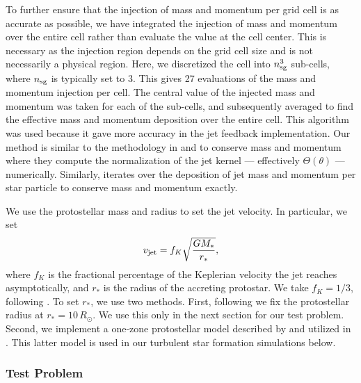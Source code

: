 \documentclass[../dissertation.tex]{subfiles}
\begin{document}
To further ensure that the injection of mass and momentum per grid cell is as accurate as possible, we have integrated the injection of mass and momentum over the entire cell rather than evaluate the value at the cell center.  This is necessary as the injection region depends on the grid cell size and is not necessarily a physical region.
Here, we discretized the cell into $n_{\rm sg}^3$ sub-cells, where $n_{\rm sg}$ is typically set to 3. This gives 27 evaluations of the mass and momentum injection per cell.
The central value of the injected mass and momentum was taken for each of the sub-cells, and subsequently averaged to find the effective mass and momentum deposition over the entire cell.
This algorithm was used because it gave more accuracy in the jet feedback implementation.
Our method is similar to the methodology in \citet{2011ApJ...740..107C} and \citet{2014MNRAS.439.3420M} to conserve mass and momentum where they compute the normalization of the jet kernel --- effectively $\Theta(\theta)$ --- numerically.
Similarly, \citet{2014ApJ...790..128F} iterates over the deposition of jet mass and momentum per star particle to conserve mass and momentum exactly.

We use the protostellar mass and radius to set the jet velocity.
In particular, we set
\begin{equation}\label{eq:jet_vjet}
v_{\rm jet} = f_{K} \sqrt{\frac{GM_*}{r_*}},
\end{equation}
where $f_{K}$ is the fractional percentage of the Keplerian velocity the jet reaches asymptotically, and $r_*$ is the radius of the accreting protostar.
We take $f_{K} = 1/3$, following \citet{2014MNRAS.439.3420M}.
To set $r_*$, we use two methods.
First, following \citet{2014ApJ...790..128F} we fix the protostellar radius at $r_* = 10\,R_{\odot}$.
We use this only in the next section for our test problem.
Second, we implement a one-zone protostellar model described by \citet[][hereafter known as O09]{2009ApJ...703..131O} and utilized in \citet{2014MNRAS.439.3420M}.
This latter model is used in our turbulent star formation simulations below.

\subsubsection{Test Problem}
\end{document}
